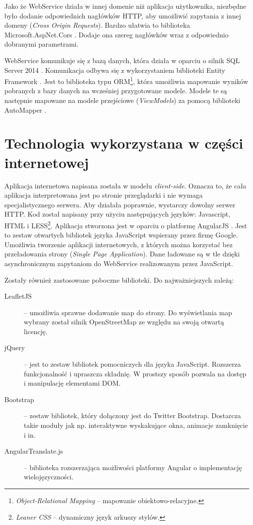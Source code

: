 \documentclass{book}
\begin{document}
		Jako że WebService działa w innej domenie niż aplikacja użytkownika, niezbędne było dodanie odpowiednich nagłówków HTTP, aby umożliwić zapytania z innej domeny (\emph{Cross Origin Requests}). Bardzo ułatwia to biblioteka Microsoft.AspNet.Cors \cite{id:ASPCors}. Dodaje ona szereg nagłówków wraz z odpowiednio dobranymi parametrami.
		
		WebService komunikuje się z bazą danych, która działa w oparciu o silnik SQL Server 2014 \cite{id:SQLServer}. Komunikacja odbywa się z wykorzystaniem biblioteki Entity Framework \cite{id:EntityFramework}. Jest to biblioteka typu ORM\footnote{\emph{Object-Relational Mapping} -- mapowanie obiektowo-relacyjne. },
		która umożliwia mapowanie wyników pobranych z bazy danych na wcześniej przygotowane modele. Modele te są następnie mapowane na modele przejściowe (\emph{ViewModels}) za pomocą biblioteki AutoMapper \cite{id:Automapper}.
		
		\section{Technologia wykorzystana w części internetowej} 
			
		Aplikacja internetowa napisana została w modelu \emph{client-side}. Oznacza to, że cała aplikacja interpretowana jest po stronie przeglądarki i nie wymaga specjalistycznego serwera. Aby działała poprawnie, wystarczy dowolny serwer HTTP. Kod został napisany przy użyciu następujących języków: Javascript, HTML i LESS\footnote{\emph{Leaner CSS} -- dynamiczny język arkuszy stylów.}. 
		Aplikacja stworzona jest w oparciu o platformę AngularJS \cite{keylist}. Jest to zestaw otwartych bibliotek języka JavaScript wspierany przez firmę Google. Umożliwia tworzenie aplikacji internetowych, z których można korzystać bez przeładowania strony (\emph{Single Page Application}). Dane ładowane są w tle dzięki asynchronicznym zapytaniom do WebService realizowanym przez JavaScript.
		
		Zostały również zastosowane poboczne biblioteki. Do najważniejszych zależą:
		
		\begin{description}
			
			\item[LeafletJS] \cite{id:Leaflet} -- 
			umożliwia sprawne dodawanie map do strony. Do wyświetlania map wybrany został silnik OpenStreetMap \cite{id:OpenStreetMaps} ze względu na swoją otwartą licencję.
			\item[jQuery] \cite{id:jQuery} -- 
			jest to zestaw bibliotek pomocniczych dla języka JavaScript. Rozszerza funkcjonalność i upraszcza składnię. W prostszy sposób pozwala na dostęp i manipulację elementami DOM.
			\item[Bootstrap] \cite{id:Bootstrap} -- 
			zestaw bibliotek, który dołączony jest do Twitter Bootstrap. Dostarcza takie moduły jak np. interaktywne wyskakujące okna, animacje zamknięcie i in.
			\item[AngularTranslate.js] \cite{id:AngularTranslate} -- 
			biblioteka rozszerzająca możliwości platformy Angular o implementację wielojęzyczności.  
		
		\end{description}
				
\end{document}
